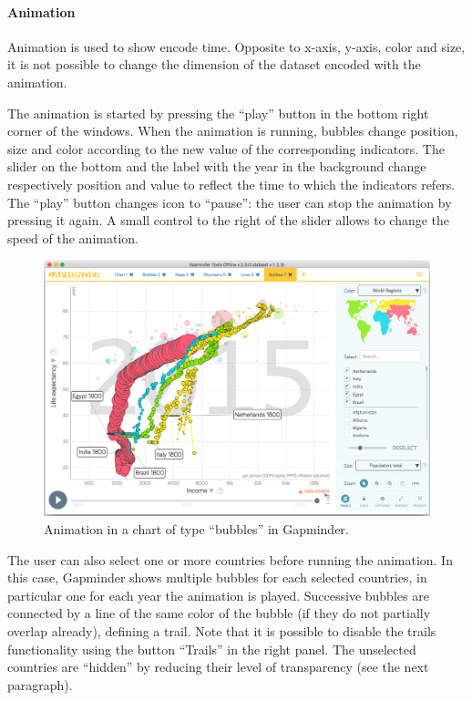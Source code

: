 \paragraph{Animation}
Animation is used to show encode time.
Opposite to x-axis, y-axis, color and size, it is not possible to change the dimension of the dataset encoded with the animation.

The animation is started by pressing the ``play'' button in the bottom right corner of the windows.
When the animation is running, bubbles change position, size and color according to the new value of the corresponding indicators.
The slider on the bottom and the label with the year in the background change respectively position and value to reflect the time to which the indicators refers.
The ``play'' button changes icon to ``pause'': the user can stop the animation by pressing it again.
A small control to the right of the slider allows to change the speed of the animation.

\begin{figure}[h]
	\centering
	\includegraphics[width=0.95\columnwidth]{figures/bubbles-animation}
	\caption{Animation in a chart of type ``bubbles'' in Gapminder.}
	\label{fig:bubbles-animation}
\end{figure}

The user can also select one or more countries before running the animation.
In this case, Gapminder shows multiple bubbles for each selected countries, in particular one for each year the animation is played.
Successive bubbles are connected by a line of the same color of the bubble (if they do not partially overlap already), defining a trail.
Note that it is possible to disable the trails functionality using the button ``Trails'' in the right panel.
The unselected countries are ``hidden'' by reducing their level of transparency (see the next paragraph).

